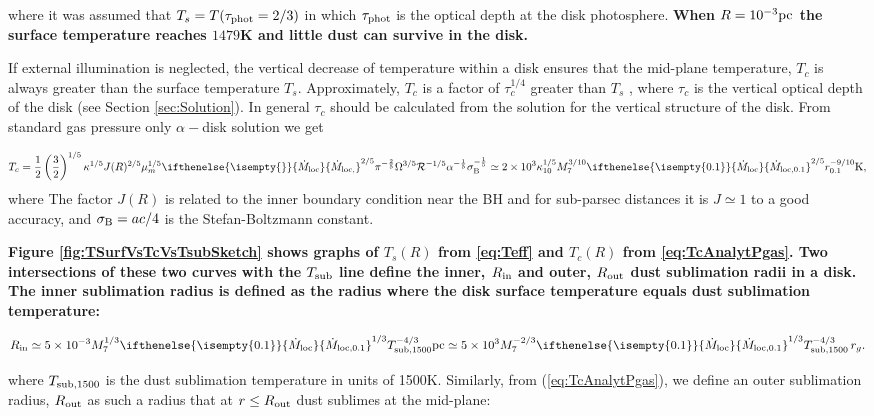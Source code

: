 \documentclass[12pt,english,preprint]{aastex}
\newcommand{\mybf}{\bf}
\newcommand{\su}[2]{#1_{\rm #2}}
\newcommand{\mdt}[1][]{ 
  \ifthenelse{\isempty{#1}}
  {\dot{M}_{\rm loc}}
  { {\dot M}_{\rm{loc},{#1}} } 
  } %
\newcommand{\Rout}{\su{R}{out}}
\newcommand{\Tsub}{ \su{T}{sub} }
\begin{document}
\noindent where it was assumed that $T_{s}=T(\tau_{{\rm phot}}=2/3)$ in which
$\tau_{{\rm phot}}$ is the optical depth at the disk photosphere.
{\mybf When $R=10^{-3}{\rm pc}$ the surface temperature reaches 
$1479$K and little dust can survive in the disk.}

If external illumination is neglected, 
the vertical decrease of temperature
within a disk ensures that the mid-plane temperature, $T_c$
is always greater than the surface temperature $T_{s}$. Approximately, 
$T_{c}$ is a factor of $\tau_{c}^{1/4}$ greater than $T_{s}$
, where $\tau_{c}$ is the vertical optical depth of the disk (see Section \ref{sec:Solution}). 
In general $\tau_{c}$ should be calculated from the solution for
the vertical structure of the disk. From standard gas pressure only
$\alpha-$disk solution we get

\begin{equation}
T_c=\frac{1}{2}\left(\frac{3}{2}\right)^{1/5}\kappa^{1/5}J(R)^{2/5}\mu_m^{1/5}
\text{\ensuremath{ \mdt }}^{2/5}\pi^{-\frac{2}{5}}\Omega^{3/5}{\cal R}^{-1/5}
\alpha^{-\frac{1}{5}}\su{\sigma}{B}^{-\frac{1}{5}}\simeq2\times10^{3}\kappa_{10}^{1/5}M_{7}^{3/10}
\text{\ensuremath{\mdt[0.1]}}^{2/5}r_{0.1}^{-9/10}{\rm K}\mbox{,}\label{eq:TcAnalytPgas}
\end{equation}
where The factor $J(R)$ is related to the inner boundary condition near the BH and for sub-parsec distances
it is $J\simeq1$ to a good accuracy, and $\su{\sigma}{B}= ac/4$ is the Stefan-Boltzmann constant.

{\mybf
Figure \ref{fig:TSurfVsTcVsTsubSketch} shows graphs of
$T_s(R)$ from \eqref{eq:Teff} and $T_c(R)$ from 
\eqref{eq:TcAnalytPgas}. Two intersections of these two curves with the
$\Tsub$ line define the inner, $\su{R}{in}$ and outer, $\su{R}{out}$ dust sublimation
radii in a disk.
The inner sublimation radius
is defined as the radius where the disk surface temperature equals 
dust sublimation temperature:

\begin{equation}
\su{R}{in}\simeq5\times10^{-3}M_{7}^{1/3}\mdt[0.1]^{1/3}\su{T}{sub,1500}
^{-4/3}{\rm pc}\simeq5\times10^{3}M_{7}^{-2/3}\mdt[0.1]^{1/3}\su{T}{sub,1500}^{-4/3}\,r_g.\label{eq:Rin}
\end{equation}

\noindent where $\su{T}{sub,1500}$ is the dust sublimation temperature in units of 1500K.  
Similarly, from (\ref{eq:TcAnalytPgas}), we define an outer sublimation radius, $R_{{\rm out}}$
as such a radius that at $r\le \Rout$ dust sublimes at the mid-plane:

}
\end{document}
